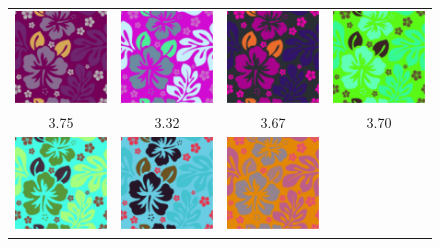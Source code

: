 \begin{figure}[htb]
\centering
\begin{tabular}{cccc}
\includegraphics[width=.2\columnwidth]{figs/colorCompat/r_0_0_3-75}&
\includegraphics[width=.2\columnwidth]{figs/colorCompat/r_0_1_3-32}&
\includegraphics[width=.2\columnwidth]{figs/colorCompat/r_0_2_3-67}&
\includegraphics[width=.2\columnwidth]{figs/colorCompat/r_0_3_3-70}\\
3.75&3.32&3.67&3.70\vspace{0.5em}\\
\includegraphics[width=.2\columnwidth]{figs/colorCompat/r_1_0_3-74}&
\includegraphics[width=.2\columnwidth]{figs/colorCompat/r_1_1_3-42}&
\includegraphics[width=.2\columnwidth]{figs/colorCompat/r_1_2_3-66}&

\end{tabular}
\end{figure}
